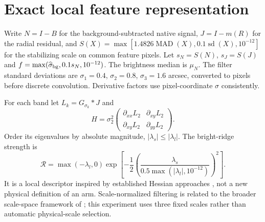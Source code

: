 \documentclass[10pt]{article}
\begin{document}
\section{Exact local feature representation}
Write $N=I-B$ for the background-subtracted native signal, $J=I-m(R)$ for the
radial residual, and $S(X)=\max[1.4826\operatorname{MAD}(X),0.1
\operatorname{sd}(X),10^{-12}]$ for the stabilizing scale on common feature
pixels. Let $s_N=S(N)$, $s_J=S(J)$ and
$f=\max(\widehat\sigma_{\rm bg},0.1s_N,10^{-12})$. The brightness median
is $\mu_N$. The filter standard deviations are
$\sigma_1=0.4$, $\sigma_2=0.8$, $\sigma_3=1.6$ arcsec, converted to pixels
before discrete convolution. Derivative factors use pixel-coordinate
$\sigma$ consistently.

For each band let $L_k=G_{\sigma_k}*J$ and
\begin{equation}
 H=\sigma_2^2\begin{pmatrix}
 \partial_{xx}L_2&\partial_{xy}L_2\\
 \partial_{xy}L_2&\partial_{yy}L_2
 \end{pmatrix}.
\end{equation}
Order its eigenvalues by absolute magnitude, $|\lambda_s|\leq|\lambda_l|$.
The bright-ridge strength is
\begin{equation}
 \mathcal R=\max(-\lambda_l,0)
 \exp\left[-\frac12\left(\frac{\lambda_s}
 {0.5\max(|\lambda_l|,10^{-12})}\right)^2\right].
\end{equation}
It is a local descriptor inspired by established Hessian approaches
\citep{frangi1998}, not a new physical definition of an arm.
Scale-normalized filtering is related to the broader scale-space framework
of \citet{lindeberg1998}; this experiment uses three fixed scales rather than
automatic physical-scale selection.
\end{document}
